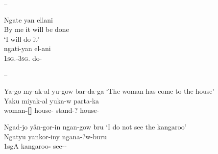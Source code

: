 \documentclass{langscibook}
\begin{document}
\begin{xlist}
\begin{xlist}
\begin{xlist}
--
\ea\label{ex:key:54}
\begin{xlist}
	\ex
	\gll Ngate   yan   ellani \\
	{By me it will be done} \\
	\glt `I will do it' \\
	\citep[88]{taplin_notes_1872}
	\ex
	\gll ngati-yan      el-ani\\
	1\textsc{sg}.-3\textsc{sg}.    do-\\
\end{xlist}
\z
--
\ea\label{bkm:Ref516554518}\label{ex:key:55}
\begin{xlist}
	\ex Ya-go         my-ak-al        yu-gow                 bar-da-ga
	\glt `The woman has come to the house' \\
	\citep{symmons_grammatical_1841}
	\ex
	\gll Yaku            miyak-al          yuka-w              parta-ka\\
	woman\textbf{{}-[]} house- stand-?      house-\\
\end{xlist}
\z

\ea\label{bkm:Ref516554630}\label{ex:key:56}
\begin{xlist}
	\ex Ngad-jo         yån-gor-in                   ngan-gow bru
	\glt `I do not see the kangaroo' \\
	\citep{symmons_grammatical_1841}
	\ex \gll Ngatyu                 yankor-iny          ngana-?w-buru\\
	1sgA        kangaroo\textbf{{}-}          see--\\
\end{xlist}
\z



\end{xlist}
\end{xlist}
\end{xlist}
\end{document}
